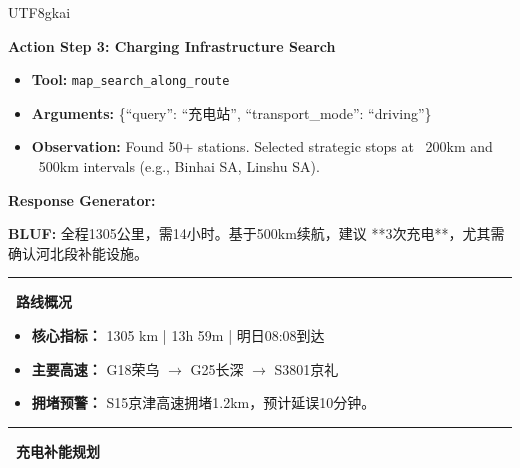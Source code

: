 \documentclass{article} %
\begin{document}
\begin{CJK*}{UTF8}{gkai}
\begin{tcolorbox}[
    breakable,
    enhanced,
    colframe=color_amapblue,
    colback=mycolor,
    coltitle=white,
    title = {\textbf{Case Study: EV Inter-provincial Travel Guide}},
    fonttitle=\bfseries
]
\textbf{Action Step 3: Charging Infrastructure Search}
\begin{itemize}[leftmargin=12pt, itemsep=0pt]
  \item \textbf{Tool:} \texttt{map\_search\_along\_route}
  \item \textbf{Arguments:} \{``query'': ``充电站'', ``transport\_mode'': ``driving''\}
  \item \textbf{Observation:} Found 50+ stations. Selected strategic stops at ~200km and ~500km intervals (e.g., Binhai SA, Linshu SA).
\end{itemize}

\vspace{5pt}

\textbf{Response Generator:}
\begin{tcolorbox}[
    breakable, %
    colback=white, 
    colframe=color_amapblue!30!white, 
    arc=4pt, 
    boxrule=1pt, 
    left=4pt, right=4pt, top=4pt, bottom=4pt
]
    \small
    \textbf{BLUF:} 全程1305公里，需14小时。基于500km续航，建议 **3次充电**，尤其需确认河北段补能设施。
    
    \par\noindent\rule{\textwidth}{0.4pt}
    
    \textbf{\textcolor{color_amapblue}{\faRoute\ 路线概况}}
    \begin{itemize}[leftmargin=12pt, itemsep=2pt, topsep=2pt]
        \item \textbf{核心指标：} 1305 km | 13h 59m | 明日08:08到达
        \item \textbf{主要高速：} G18荣乌 $\rightarrow$ G25长深 $\rightarrow$ S3801京礼
        \item \textbf{拥堵预警：} S15京津高速拥堵1.2km，预计延误10分钟。
    \end{itemize}
    
    \par\noindent\rule{\textwidth}{0.4pt}
    
    \textbf{\textcolor{color_amapblue}{\faChargingStation\ 充电补能规划}}
    \begin{center}
    \renewcommand{\arraystretch}{1.2}
    \end{center}


\end{tcolorbox}
\end{tcolorbox}
\end{CJK*}
\end{document}
